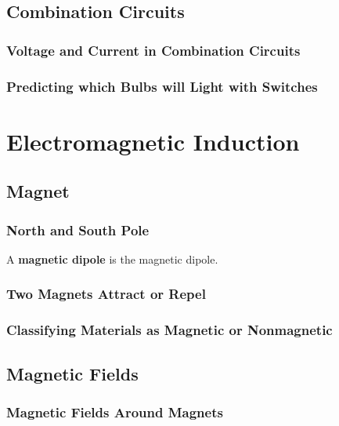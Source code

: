 \documentclass[dvipsnames]{article}
\newif\ifShowUnitX                               %
\begin{document}
\subsection{Combination Circuits}

\subsubsection{Voltage and Current in Combination Circuits}

\subsubsection{Predicting which Bulbs will Light with Switches}

\fi

\clearpage

\section{Electromagnetic Induction}

\ifShowUnitX

\subsection{Magnet}

\subsubsection{North and South Pole}

A \textbf{\gls{magnetic dipole}} is the \glsdesc{magnetic dipole}.

\subsubsection{Two Magnets Attract or Repel}

\subsubsection{Classifying Materials as Magnetic or Nonmagnetic}

\subsection{Magnetic Fields}

\subsubsection{Magnetic Fields Around Magnets}
\end{document}
